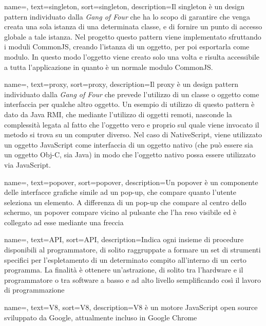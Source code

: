 {
    name=,
    text=singleton,
    sort=singleton,
    description={Il singleton è un design pattern individuato dalla \textit{Gang of Four} che ha lo scopo di garantire che venga creata una sola istanza di una determinata classe, e di fornire un punto di accesso globale a tale istanza.
     Nel progetto questo pattern viene implementato sfruttando i moduli CommonJS, creando l'istanza di un oggetto, per poi esportarla come modulo. In questo modo l'oggetto viene creato solo una volta e risulta accessibile a tutta l'applicazione in quanto è un normale modulo CommonJS.
    }
}

{
    name=,
    text=proxy,
    sort=proxy,
    description={Il proxy è un design pattern individuato dalla \textit{Gang of Four} che prevede l'utilizzo di un classe o oggetto come interfaccia per qualche altro oggetto. Un esempio di utilizzo di questo pattern è dato da Java RMI, che mediante l'utilizzo di oggetti remoti, nasconde la complessità legata al fatto che l'oggetto vero e proprio sul quale viene invocato il metodo si trova su un computer diverso. Nel caso di NativeScript, viene utilizzato un oggetto JavaScript come interfaccia di un oggetto nativo (che può essere sia un oggetto Obj-C, sia Java) in modo che l'oggetto nativo possa essere utilizzato via JavaScript.}
}


{
    name=,
    text=popover,
    sort=popover,
    description={Un popover è un componente delle interfacce grafiche simile ad un pop-up, che compare quanto l'utente seleziona un elemento. A differenza di un pop-up che compare al centro dello schermo, un popover compare vicino al pulsante che l'ha reso visibile ed è collegato ad esse mediante una freccia}
}

{
    name=,
    text=API,
    sort=API,
    description={Indica ogni insieme di procedure disponibili al programmatore, di solito raggruppate a formare un set di strumenti specifici per l'espletamento di un determinato compito all'interno di un certo programma. La finalità è ottenere un'astrazione, di solito tra l'hardware e il programmatore o tra software a basso e ad alto livello semplificando così il lavoro di programmazione}
}

{
    name=,
    text=V8,
    sort=V8,
    description={V8 è un motore JavaScript open source sviluppato da Google, attualmente incluso in Google Chrome}
}

